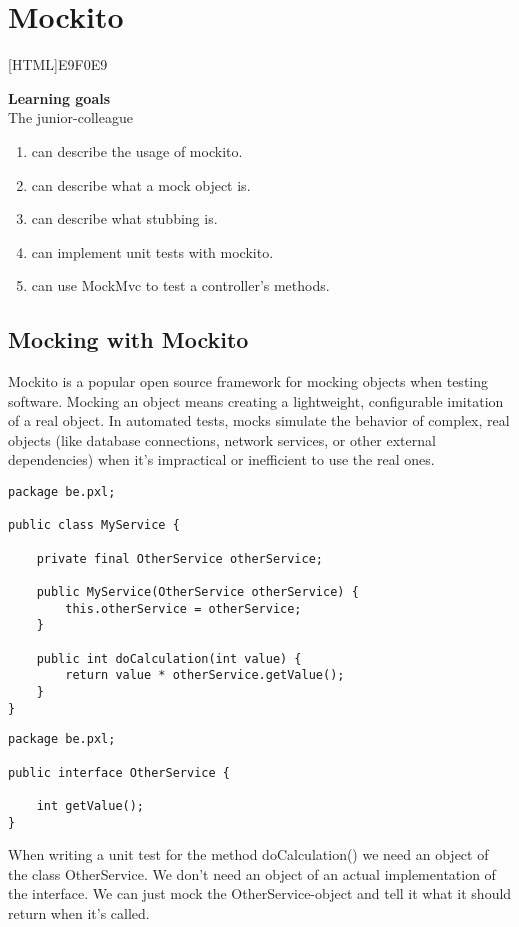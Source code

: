 \chapter{Mockito}

[HTML]{E9F0E9}{\parbox{\textwidth}{%
\noindent \textbf{Learning goals}\\
The junior-colleague
\begin{enumerate}[nolistsep]
\item can describe the usage of mockito.
\item can describe what a mock object is.
\item can describe what stubbing is.
\item can implement unit tests with mockito.
\item can use MockMvc to test a controller's methods.
\end{enumerate}}}

\section{Mocking with Mockito}

Mockito is a popular open source framework for mocking objects when testing software.  Mocking an object means creating a lightweight, configurable imitation of a real object.  In automated tests, mocks simulate the behavior of complex, real objects (like database connections, network services, or other external dependencies) when it's impractical or inefficient to use the real ones.

\begin{lstlisting}
package be.pxl;

public class MyService {

    private final OtherService otherService;

    public MyService(OtherService otherService) {
        this.otherService = otherService;
    }

    public int doCalculation(int value) {
        return value * otherService.getValue();
    }
}
\end{lstlisting}

\begin{lstlisting}
package be.pxl;

public interface OtherService {

    int getValue();
}
\end{lstlisting}

When writing a unit test for the method doCalculation() we need an object of the class OtherService. We don't need an object of an actual implementation of the interface. We can just mock the OtherService-object and tell it what it should return when it's called.

